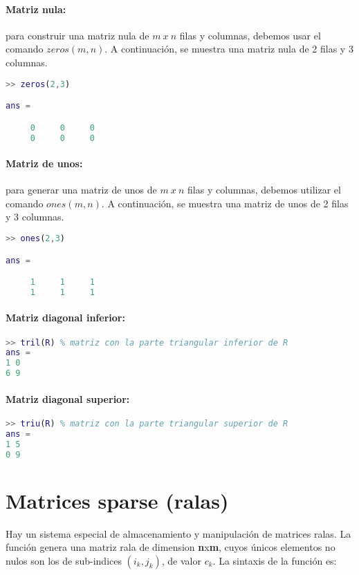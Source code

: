 \paragraph{Matriz nula:} para construir una matriz nula de $m~x~n$ filas y columnas, debemos usar el comando $zeros(m,n)$. A continuación, se muestra una matriz nula de 2 filas y 3 columnas.
\begin{lstlisting}[language=Matlab]
>> zeros(2,3)

ans =

     0     0     0
     0     0     0

\end{lstlisting}

\paragraph{Matriz de unos:} para generar una matriz de unos de $m~x~n$ filas y columnas, debemos utilizar el comando $ones(m,n)$. A continuación, se muestra una matriz de unos de 2 filas y 3 columnas.
\begin{lstlisting}[language=Matlab]
>> ones(2,3)

ans =

     1     1     1
     1     1     1

\end{lstlisting}

\paragraph{Matriz diagonal inferior:}
\begin{lstlisting}[language=Matlab]
>> tril(R) % matriz con la parte triangular inferior de R
ans =
1 0
6 9
\end{lstlisting}

\paragraph{Matriz diagonal superior:}
\begin{lstlisting}[language=Matlab]
>> triu(R) % matriz con la parte triangular superior de R
ans =
1 5
0 9
\end{lstlisting}

\section{Matrices sparse (ralas)}

Hay un sistema especial de almacenamiento y manipulación de matrices ralas. La función genera una matriz rala de dimension \textbf{n}x\textbf{m}, cuyos únicos elementos no nulos son los de sub-indices $(i_{k},j_{k})$, de valor \textbf{$c_{k}$}. La sintaxis de la función es:

